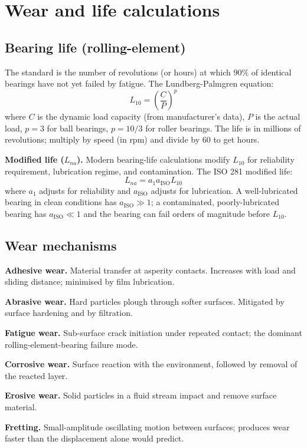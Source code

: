 \section{Wear and life calculations}

\subsection{Bearing life (rolling-element)}

The standard  is the number of revolutions (or hours) at which 90\% of identical bearings have not yet failed by fatigue. The Lundberg-Palmgren equation:
\[
L_{10} = \left( \frac{C}{P} \right)^p
\]
where $C$ is the dynamic load capacity (from manufacturer's data), $P$ is the actual load, $p = 3$ for ball bearings, $p = 10/3$ for roller bearings. The life is in millions of revolutions; multiply by speed (in rpm) and divide by 60 to get hours.

\textbf{Modified life ($L_{na}$).} Modern bearing-life calculations modify $L_{10}$ for reliability requirement, lubrication regime, and contamination. The ISO 281 modified life:
\[
L_{na} = a_1 a_{\mathrm{ISO}} L_{10}
\]
where $a_1$ adjusts for reliability and $a_{\mathrm{ISO}}$ adjusts for lubrication. A well-lubricated bearing in clean conditions has $a_{\mathrm{ISO}} \gg 1$; a contaminated, poorly-lubricated bearing has $a_{\mathrm{ISO}} \ll 1$ and the bearing can fail orders of magnitude before $L_{10}$.

\subsection{Wear mechanisms}

\textbf{Adhesive wear.} Material transfer at asperity contacts. Increases with load and sliding distance; minimised by film lubrication.

\textbf{Abrasive wear.} Hard particles plough through softer surfaces. Mitigated by surface hardening and by filtration.

\textbf{Fatigue wear.} Sub-surface crack initiation under repeated contact; the dominant rolling-element-bearing failure mode.

\textbf{Corrosive wear.} Surface reaction with the environment, followed by removal of the reacted layer.

\textbf{Erosive wear.} Solid particles in a fluid stream impact and remove surface material.

\textbf{Fretting.} Small-amplitude oscillating motion between surfaces; produces wear faster than the displacement alone would predict.

